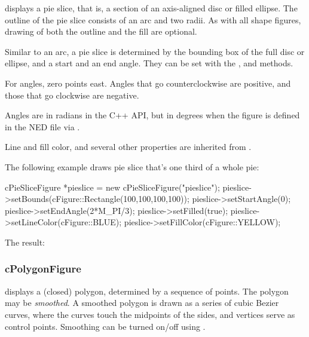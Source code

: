  displays a pie slice, that is, a section of an
axis-aligned disc or filled ellipse.  The outline of the pie slice consists
of an arc and two radii. As with all shape figures, drawing of both the
outline and the fill are optional.

Similar to an arc, a pie slice is determined by the bounding box of the
full disc or ellipse, and a start and an end angle. They can be set with
the ,  and 
methods.

For angles, zero points east. Angles that go counterclockwise are
positive, and those that go clockwise are negative.

\begin{note}
Angles are in radians in the C++ API, but in degrees when the figure is
defined in the NED file via .
\end{note}

Line and fill color, and several other properties are inherited from
.

The following example draws pie slice that's one third of a whole pie:

\begin{cpp}
cPieSliceFigure *pieslice = new cPieSliceFigure("pieslice");
pieslice->setBounds(cFigure::Rectangle(100,100,100,100));
pieslice->setStartAngle(0);
pieslice->setEndAngle(2*M_PI/3);
pieslice->setFilled(true);
pieslice->setLineColor(cFigure::BLUE);
pieslice->setFillColor(cFigure::YELLOW);
\end{cpp}


The result:

\begin{center}

\end{center}


\subsubsection{cPolygonFigure}
\label{sec:graphics:polygonfigure}

 displays a (closed) polygon, determined by a sequence of points.
The polygon may be \textit{smoothed}. A smoothed polygon is drawn as a series
of cubic Bezier curves, where the curves touch the midpoints of the sides,
and vertices serve as control points. Smoothing can be turned on/off
using .

